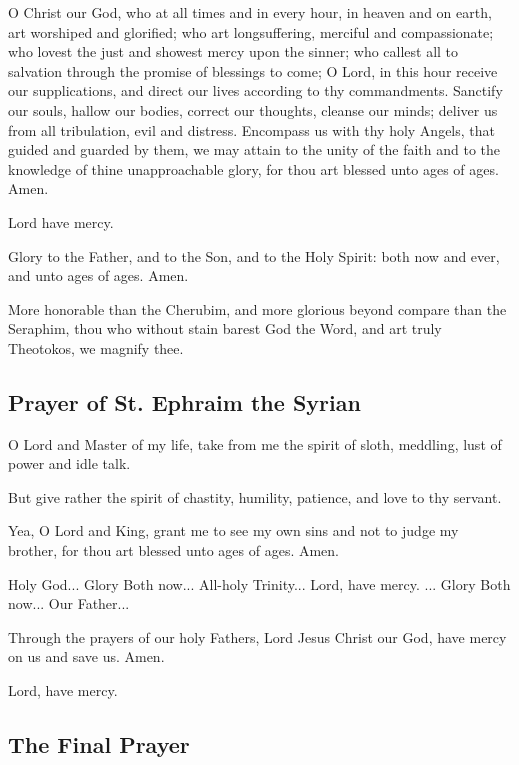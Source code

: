 O Christ our God, who at all times and in every hour, in heaven and on earth, art worshiped and glorified; who art longsuffering, merciful and compassionate; who lovest the just and showest mercy upon the sinner; who callest all to salvation through the promise of blessings to come; O Lord, in this hour receive our supplications, and direct our lives according to thy commandments. Sanctify our souls, hallow our bodies, correct our thoughts, cleanse our minds; deliver us from all tribulation, evil and distress. Encompass us with thy holy Angels, that guided and guarded by them, we may attain to the unity of the faith and to the knowledge of thine unapproachable glory, for thou art blessed unto ages of ages. Amen.

Lord have mercy. 

Glory to the Father, and to the Son, and to the Holy Spirit: both now and ever, and unto ages of ages. Amen.

More honorable than the Cherubim, and more glorious beyond compare than the Seraphim, thou who without stain barest God the Word, and art truly Theotokos, we magnify thee.

\subsection{Prayer of St. Ephraim the Syrian}


O Lord and Master of my life, take from me the spirit of sloth, meddling, lust of power and idle talk. 

But give rather the spirit of chastity, humility, patience, and love to thy servant. 

Yea, O Lord and King, grant me to see my own sins and not to judge my brother, for thou art blessed unto ages of ages. Amen. 

Holy God... Glory  Both now... All-holy Trinity... Lord, have mercy. ... Glory  Both now... Our Father...

Through the prayers of our holy Fathers, Lord Jesus Christ our God, have mercy on us and save us. Amen.

Lord, have mercy. 

\subsection{The Final Prayer}

